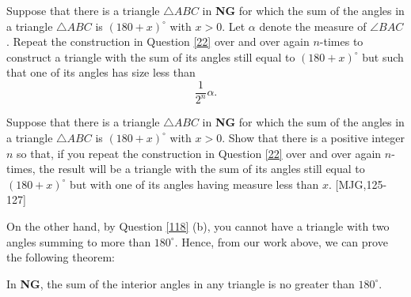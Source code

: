 \begin{question}
\label{21} Suppose that there is a triangle $\triangle ABC$ in
\textbf{NG} for which the sum of the angles in a triangle $\triangle ABC$ is
$\left( 180+x\right)^\circ$ with $x>0$. Let $\alpha$ denote the
measure of $\angle BAC$. Repeat the construction in Question \ref{22}
over and over again $n$-times to construct a triangle with the sum of
its angles still equal to $\left( 180+x\right)^\circ$ but such that
one of its angles has size less than%
\[
\frac{1}{2^{n}}\alpha.
\]
\end{question}

\begin{question}
\label{121} Suppose that there is a triangle $\triangle ABC$ in
\textbf{NG} for which the sum of the angles in a triangle $\triangle ABC$ is
$\left( 180+x\right)^\circ$ with $x>0$. Show that there is a positive
integer $n$ so that, if you repeat the construction in
Question \ref{22} over and over again $n$-times, the result will be a
triangle with the sum of its angles still equal to $\left(
180+x\right)^\circ$ but with one of its angles having measure less
than $x$. [MJG,125-127]
\end{question}


On the other hand, by Question \ref{118} (b), you cannot have a
triangle with two angles summing to more than $180^\circ$. Hence, from
our work above, we can prove the following theorem:

\begin{theorem}
In \textbf{NG}, the sum of the interior angles in any triangle is no greater
than $180^\circ$.
\end{theorem}

